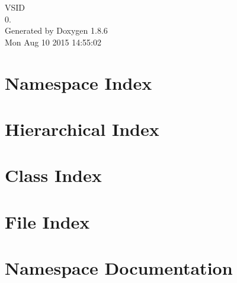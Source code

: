 \documentclass[twoside]{book}
\newcommand{\clearemptydoublepage}{%
  \newpage{\pagestyle{empty}\cleardoublepage}%
}
\begin{document}
\hypersetup{pageanchor=false}
\begin{titlepage}
\vspace*{7cm}
\begin{center}%
{\Large V\-S\-I\-D \\[1ex]\large 0. }\\
\vspace*{1cm}
{\large Generated by Doxygen 1.8.6}\\
\vspace*{0.5cm}
{\small Mon Aug 10 2015 14:55:02}\\
\end{center}
\end{titlepage}
\clearemptydoublepage
\tableofcontents
\clearemptydoublepage
{}
\hypersetup{pageanchor=true}

\chapter{Namespace Index}

\chapter{Hierarchical Index}

\chapter{Class Index}

\chapter{File Index}

\chapter{Namespace Documentation}





\end{document}
